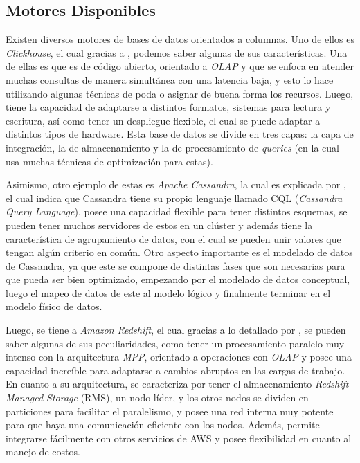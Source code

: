 \subsection{Motores Disponibles}
Existen diversos motores de bases de datos orientados a columnas. Uno de ellos es \textit{Clickhouse}, el cual gracias a \textcite{schulze2024}, podemos saber algunas de sus características. Una de ellas es que es de código abierto, orientado a \textit{OLAP} y que se enfoca en atender muchas consultas de manera simultánea con una latencia baja, y esto lo hace utilizando algunas técnicas de poda o asignar de buena forma los recursos. Luego, tiene la capacidad de adaptarse a distintos formatos, sistemas para lectura y escritura, así como tener un despliegue flexible, el cual se puede adaptar a distintos tipos de hardware. Esta base de datos se divide en tres capas: la capa de integración, la de almacenamiento y la de procesamiento de \textit{queries} (en la cual usa muchas técnicas de optimización para estas).

	Asimismo, otro ejemplo de estas es \textit{Apache Cassandra}, la cual es explicada por \textcite{dourhri2021}, el cual indica que Cassandra tiene su propio lenguaje llamado CQL (\textit{Cassandra Query Language}), posee una capacidad flexible para tener distintos esquemas, se pueden tener muchos servidores de estos en un clúster y además tiene la característica de agrupamiento de datos, con el cual se pueden unir valores que tengan algún criterio en común. Otro aspecto importante es el modelado de datos de Cassandra, ya que este se compone de distintas fases que son necesarias para que pueda ser bien optimizado, empezando por el modelado de datos conceptual, luego el mapeo de datos de este al modelo lógico y finalmente terminar en el modelo físico de datos.

	Luego, se tiene a \textit{Amazon Redshift}, el cual gracias a lo detallado por \textcite{borra2024}, se pueden saber algunas de sus peculiaridades, como tener un procesamiento paralelo muy intenso con la arquitectura \textit{MPP}, orientado a operaciones con \textit{OLAP} y posee una capacidad increíble para adaptarse a cambios abruptos en las cargas de trabajo. En cuanto a su arquitectura, se caracteriza por tener el almacenamiento \textit{Redshift Managed Storage} (RMS), un nodo líder, y los otros nodos se dividen en particiones para facilitar el paralelismo, y posee una red interna muy potente para que haya una comunicación eficiente con los nodos. Además, permite integrarse fácilmente con otros servicios de AWS y posee flexibilidad en cuanto al manejo de costos.

